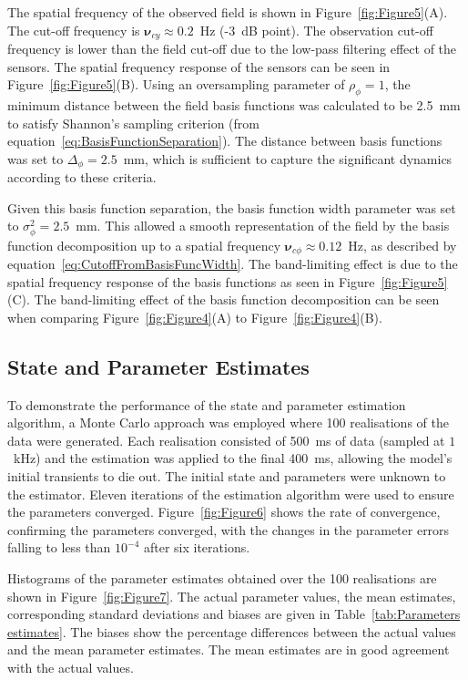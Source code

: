 \documentclass[12pt]{iopart}
\begin{document}
The spatial frequency of the observed field is shown in Figure~\ref{fig:Figure5}(A). The cut-off frequency is $\boldsymbol{\nu}_{cy} \approx 0.2$~Hz (-3~dB point). The observation cut-off frequency is lower than the field cut-off due to the low-pass filtering effect of the sensors. The spatial frequency response of the sensors can be seen in Figure~\ref{fig:Figure5}(B). Using an oversampling parameter of $\rho_{\phi}=1$, the minimum distance between the field basis functions was calculated to be 2.5~mm to satisfy Shannon's sampling criterion (from equation~\ref{eq:BasisFunctionSeparation}). The distance between basis functions was set to $\Delta_{\phi}=2.5$~mm, which is sufficient to capture the significant dynamics according to these criteria.

Given this basis function separation, the basis function width parameter was set to $\sigma_{\phi}^2=2.5$~mm. This allowed a smooth representation of the field by the basis function decomposition up to a spatial frequency $\boldsymbol{\nu}_{c\phi} \approx 0.12$~Hz, as described by equation~\ref{eq:CutoffFromBasisFuncWidth}. The band-limiting effect is due to the spatial frequency response of the basis functions as seen in Figure~\ref{fig:Figure5}(C). The band-limiting effect of the basis function decomposition can be seen when comparing Figure~\ref{fig:Figure4}(A) to Figure~\ref{fig:Figure4}(B).

\subsection{State and Parameter Estimates} 
\label{sec:state_and_param_results}
To demonstrate the performance of the state and parameter estimation algorithm, a Monte Carlo approach was employed where 100 realisations of the data were generated. Each realisation consisted of 500~ms of data (sampled at $1$~kHz) and the estimation was applied to the final 400~ms, allowing the model's initial transients to die out. The initial state and parameters were unknown to the estimator. Eleven iterations of the estimation algorithm were used to ensure the parameters  converged. Figure~\ref{fig:Figure6} shows the rate of convergence, confirming the parameters converged, with the changes in the parameter errors falling to less than $10^{-4}$ after six iterations.

Histograms of the parameter estimates obtained over the 100 realisations are shown in Figure~\ref{fig:Figure7}. The actual parameter values, the mean estimates, corresponding standard deviations and biases are given in Table~\ref{tab:Parameters estimates}. The biases show the percentage differences between the actual values and the mean parameter estimates. The mean estimates are in good agreement with the actual values.
\end{document}
